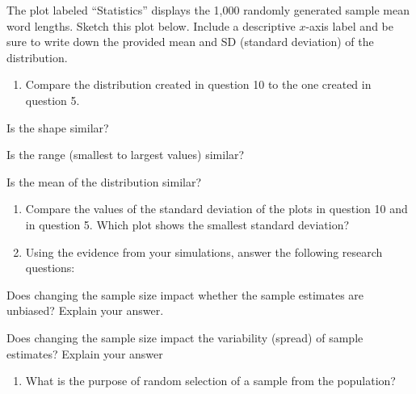 \documentclass[
]{report}
\providecommand{\tightlist}{%
  \setlength{\itemsep}{0pt}\setlength{\parskip}{0pt}}
\newcommand{\rgi}{\hspace{24pt}}  %
\begin{document}
The plot labeled ``Statistics'' displays the 1,000 randomly generated sample mean word lengths. Sketch this plot below. Include a descriptive \(x\)-axis label and be sure to write down the provided mean and SD (standard deviation) of the distribution.
\vspace{2in}

\begin{enumerate}
\def\labelenumi{\arabic{enumi}.}
\setcounter{enumi}{10}
\tightlist
\item
  Compare the distribution created in question 10 to the one created in question 5.
\end{enumerate}

\rgi Is the shape similar?\\
\vspace{0.2in}

\rgi Is the range (smallest to largest values) similar?

\vspace{0.2in}

\rgi Is the mean of the distribution similar?

\vspace{0.2in}

\begin{enumerate}
\def\labelenumi{\arabic{enumi}.}
\setcounter{enumi}{11}
\item
  Compare the values of the standard deviation of the plots in question 10 and in question 5. Which plot shows the smallest standard deviation?
  \vspace{0.4in}
\item
  Using the evidence from your simulations, answer the following research questions:
\end{enumerate}

\rgi Does changing the sample size impact whether the sample estimates are unbiased? Explain your answer.
\vspace{0.5in}

\rgi Does changing the sample size impact the variability (spread) of sample estimates? Explain your answer
\vspace{0.5in}

\begin{enumerate}
\def\labelenumi{\arabic{enumi}.}
\setcounter{enumi}{13}
\tightlist
\item
  What is the purpose of random selection of a sample from the population?
\end{enumerate}

\vspace{0.8in}
\end{document}
